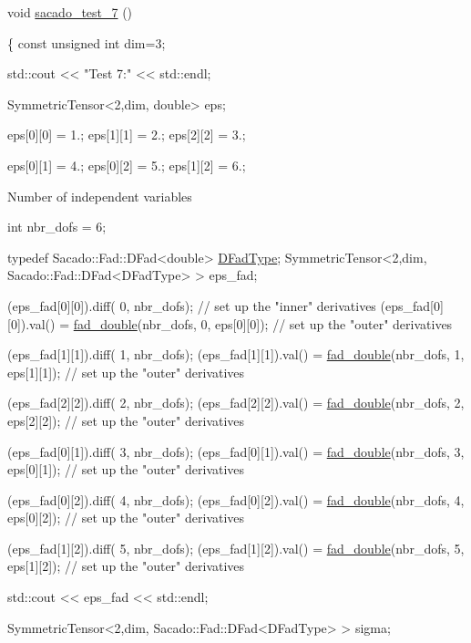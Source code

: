 \begin{DoxyCode}
\textcolor{keywordtype}{void} \hyperlink{Sacado__example_8cc_a0b694459e5e15c1578d97e637faba8de}{sacado\_test\_7} ()
 
\{
    \textcolor{keyword}{const} \textcolor{keywordtype}{unsigned} \textcolor{keywordtype}{int} dim=3;
 
    std::cout << \textcolor{stringliteral}{"Test 7:"} << std::endl;
 
     SymmetricTensor<2,dim, double> eps;
 
     eps[0][0] = 1.;
     eps[1][1] = 2.;
     eps[2][2] = 3.;
 
     eps[0][1] = 4.;
     eps[0][2] = 5.;
     eps[1][2] = 6.;
\end{DoxyCode}
 Number of independent variables 
\begin{DoxyCode}
 \textcolor{keywordtype}{int} nbr\_dofs = 6;

\textcolor{keyword}{typedef} Sacado::Fad::DFad<double> \hyperlink{Sacado__Wrapper_8h_a7e0893207b87dad05c66a34baac8ed2e}{DFadType};
 SymmetricTensor<2,dim, Sacado::Fad::DFad<DFadType> > eps\_fad;


(eps\_fad[0][0]).diff( 0, nbr\_dofs); \textcolor{comment}{// set up the "inner" derivatives}
(eps\_fad[0][0]).val() = \hyperlink{Sacado__example_8cc_a868b94676739e612d9c95940e70892a9}{fad\_double}(nbr\_dofs, 0, eps[0][0]); \textcolor{comment}{// set up the "outer" derivatives}

(eps\_fad[1][1]).diff( 1, nbr\_dofs);
(eps\_fad[1][1]).val() = \hyperlink{Sacado__example_8cc_a868b94676739e612d9c95940e70892a9}{fad\_double}(nbr\_dofs, 1, eps[1][1]); \textcolor{comment}{// set up the "outer" derivatives}

(eps\_fad[2][2]).diff( 2, nbr\_dofs);
(eps\_fad[2][2]).val() = \hyperlink{Sacado__example_8cc_a868b94676739e612d9c95940e70892a9}{fad\_double}(nbr\_dofs, 2, eps[2][2]); \textcolor{comment}{// set up the "outer" derivatives}

(eps\_fad[0][1]).diff( 3, nbr\_dofs);
(eps\_fad[0][1]).val() = \hyperlink{Sacado__example_8cc_a868b94676739e612d9c95940e70892a9}{fad\_double}(nbr\_dofs, 3, eps[0][1]); \textcolor{comment}{// set up the "outer" derivatives}

(eps\_fad[0][2]).diff( 4, nbr\_dofs);
(eps\_fad[0][2]).val() = \hyperlink{Sacado__example_8cc_a868b94676739e612d9c95940e70892a9}{fad\_double}(nbr\_dofs, 4, eps[0][2]); \textcolor{comment}{// set up the "outer" derivatives}

(eps\_fad[1][2]).diff( 5, nbr\_dofs);
(eps\_fad[1][2]).val() = \hyperlink{Sacado__example_8cc_a868b94676739e612d9c95940e70892a9}{fad\_double}(nbr\_dofs, 5, eps[1][2]); \textcolor{comment}{// set up the "outer" derivatives}

std::cout << eps\_fad << std::endl;

 SymmetricTensor<2,dim, Sacado::Fad::DFad<DFadType> > sigma;
\end{DoxyCode}
